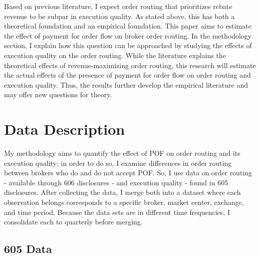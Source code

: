 \documentclass[12pt,a4paper]{article}
\begin{document}
Based on previous literature, I expect order routing that prioritizes rebate revenue to be subpar in execution quality. As stated above, this has both a theoretical foundation and an empirical foundation. This paper aims to estimate the effect of payment for order flow on broker order routing. In the methodology section, I explain how this question can be approached by studying the effects of execution quality on the order routing. While the literature explains the theoretical effects of revenue-maximizing order routing, this research will estimate the actual effects of the presence of payment for order flow on order routing and execution quality. Thus, the results further develop the empirical literature and may offer new questions for theory. 






	
	
\section{Data Description}

	My methodology aims to quantify the effect of POF on order routing and its execution quality; in order to do so, I examine differences in order routing between brokers who do and do not accept POF. So, I use data on order routing - available through 606 disclosures - and execution quality - found in 605 disclosures.  After collecting the data, I merge both into a dataset where each observation belongs corresponds to a specific broker, market center, exchange, and time period. Because the data sets are in different time frequencies, I consolidate each to quarterly before merging. 
	
	\subsection{605 Data}
	
	
\end{document}
